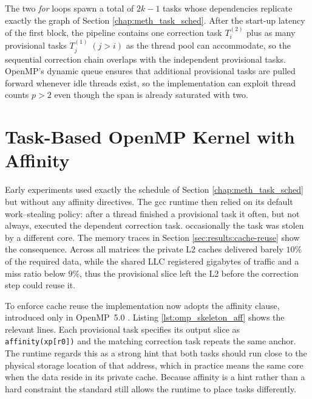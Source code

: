 The two \emph{for} loops spawn a total of $2k-1$ tasks whose
dependencies replicate exactly the graph of Section \ref{chap:meth_task_sched}.  After the start-up latency of the first block, the pipeline contains
one correction task $T^{(2)}_{i}$ plus as many provisional tasks $T^{(1)}_{j}\;(j>i)$ as the thread pool can accommodate, so the sequential correction chain overlaps with the independent provisional tasks.
OpenMP’s dynamic queue ensures that additional provisional tasks are
pulled forward whenever idle threads exist, so the implementation can
exploit thread counts $p>2$ even though the span is already saturated
with two.

\section{Task-Based OpenMP Kernel with Affinity}
\label{sec:impl_tasks_aff}

Early experiments used exactly the schedule of
Section \ref{chap:meth_task_sched} but without any affinity
directives.  The gcc runtime then relied on its default work–stealing policy:
after a thread finished a provisional task it often, but not
always, executed the dependent correction task. occasionally the task
was stolen by a different core. The memory traces in Section \ref{sec:results:cache-reuse} show the
consequence.  Across all matrices the private L2 caches delivered barely
$10 \%$ of the required data, while the shared LLC registered
gigabytes of traffic and a miss ratio below $9 \%$, thus the provisional
slice left the L2 before the correction step could reuse it.

To enforce cache reuse the implementation now
adopts the affinity clause, introduced only in
OpenMP~5.0 \cite{openmp5.0}.  
Listing \ref{lst:omp_skeleton_aff} shows the relevant lines.
Each provisional task specifies its output slice as
\verb|affinity(xp[r0])| and the matching correction task repeats the
same anchor.  The runtime regards this as a strong hint that both tasks should run
close to the physical storage location of that address, which in
practice means the same core when the data reside in its private cache.
Because affinity is a hint rather than a hard constraint the
standard still allows the runtime to place tasks differently.

